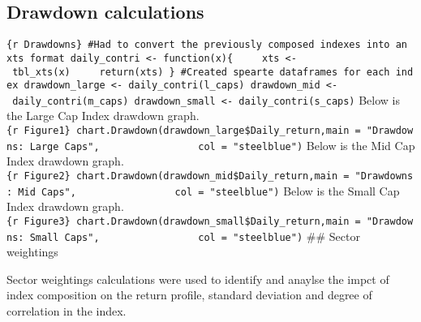 \documentclass[
]{article}
\begin{document}
\hypertarget{drawdown-calculations}{%
\subsection{Drawdown calculations}\label{drawdown-calculations}}

\texttt{\{r\ Drawdowns\}\ \#Had\ to\ convert\ the\ previously\ composed\ indexes\ into\ an\ xts\ format\ daily\_contri\ \textless{}-\ function(x)\{\ \ \ \ \ xts\ \textless{}-\ tbl\_xts(x)\ \ \ \ \ return(xts)\ \}\ \#Created\ spearte\ dataframes\ for\ each\ index\ drawdown\_large\ \textless{}-\ daily\_contri(l\_caps)\ drawdown\_mid\ \textless{}-\ daily\_contri(m\_caps)\ drawdown\_small\ \textless{}-\ daily\_contri(s\_caps)}
Below is the Large Cap Index drawdown graph.
\texttt{\{r\ Figure1\}\ chart.Drawdown(drawdown\_large\$Daily\_return,main\ =\ "Drawdowns:\ Large\ Caps",\ \ \ \ \ \ \ \ \ \ \ \ \ \ \ \ \ col\ =\ "steelblue")}
Below is the Mid Cap Index drawdown graph.
\texttt{\{r\ Figure2\}\ chart.Drawdown(drawdown\_mid\$Daily\_return,main\ =\ "Drawdowns:\ Mid\ Caps",\ \ \ \ \ \ \ \ \ \ \ \ \ \ \ \ \ col\ =\ "steelblue")}
Below is the Small Cap Index drawdown graph.
\texttt{\{r\ Figure3\}\ chart.Drawdown(drawdown\_small\$Daily\_return,main\ =\ "Drawdowns:\ Small\ Caps",\ \ \ \ \ \ \ \ \ \ \ \ \ \ \ \ \ col\ =\ "steelblue")}
\#\# Sector weightings

Sector weightings calculations were used to identify and anaylse the
impct of index composition on the return profile, standard deviation and
degree of correlation in the index.
\end{document}
